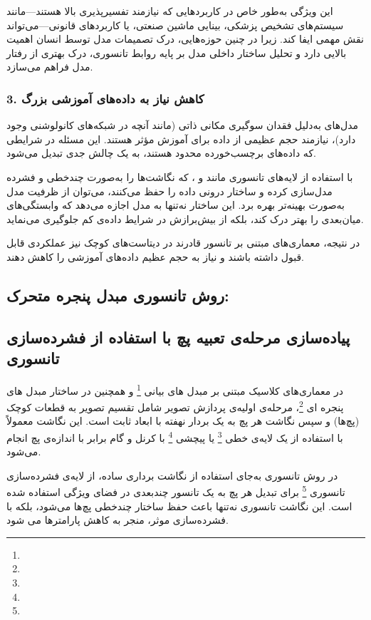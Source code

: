 این ویژگی به‌طور خاص در کاربردهایی که نیازمند تفسیرپذیری بالا هستند—مانند سیستم‌های تشخیص پزشکی، بینایی ماشین صنعتی، یا کاربردهای قانونی—می‌تواند نقش مهمی ایفا کند. زیرا در چنین حوزه‌هایی، درک تصمیمات مدل توسط انسان اهمیت بالایی دارد و تحلیل ساختار داخلی مدل بر پایه روابط تانسوری، درک بهتری از رفتار مدل فراهم می‌سازد.


\subsubsection*{3. \textbf{کاهش نیاز به داده‌های آموزشی بزرگ}}

مدل‌های  به‌دلیل فقدان سوگیری مکانی ذاتی (مانند آنچه در شبکه‌های کانولوشنی وجود دارد)، نیازمند حجم عظیمی از داده برای آموزش مؤثر هستند. این مسئله در شرایطی که داده‌های برچسب‌خورده محدود هستند، به یک چالش جدی تبدیل می‌شود.

با استفاده از لایه‌های تانسوری مانند  و ، که نگاشت‌ها را به‌صورت چندخطی و فشرده مدل‌سازی کرده و ساختار درونی داده را حفظ می‌کنند، می‌توان از ظرفیت مدل به‌صورت بهینه‌تر بهره برد. این ساختار نه‌تنها به مدل اجازه می‌دهد که وابستگی‌های میان‌بعدی را بهتر درک کند، بلکه از بیش‌برازش در شرایط داده‌ی کم جلوگیری می‌نماید.

در نتیجه، معماری‌های مبتنی بر تانسور قادرند در دیتاست‌های کوچک نیز عملکردی قابل قبول داشته باشند و نیاز به حجم عظیم داده‌های آموزشی را کاهش دهند.



\subsection{روش تانسوری مبدل پنجره متحرک:}




\subsection{پیاده‌سازی مرحله‌ی  تعبیه پچ
	با استفاده از فشرده‌سازی تانسوری}

در معماری‌های کلاسیک مبتنی بر مبدل های بیانی \footnote{}  و همچنین در ساختار مبدل های پنجره ای \footnote{}، مرحله‌ی اولیه‌ی پردازش تصویر شامل تقسیم تصویر به قطعات کوچک (پچ‌ها) و سپس نگاشت هر پچ به یک بردار نهفته با ابعاد ثابت است. این نگاشت معمولاً با استفاده از یک لایه‌ی خطی \footnote{} یا پیچشی \footnote{} با کرنل و گام برابر با اندازه‌ی پچ انجام می‌شود.

در روش تانسوری به‌جای استفاده از نگاشت برداری ساده، از لایه‌ی فشرده‌سازی تانسوری \footnote{} برای تبدیل هر پچ به یک تانسور چندبعدی در فضای ویژگی استفاده شده است. این نگاشت تانسوری نه‌تنها باعث حفظ ساختار چندخطی پچ‌ها می‌شود، بلکه با فشرده‌سازی موثر، منجر به کاهش پارامترها می شود.




